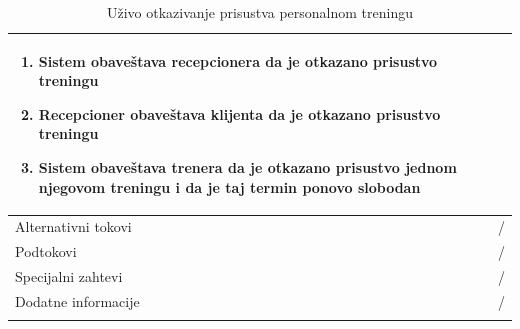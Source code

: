 \begin{longtable}{| p{} | p{} |}
\begin{enumerate}
    \item Sistem obaveštava recepcionera da je otkazano prisustvo treningu
    \item Recepcioner obaveštava klijenta da je otkazano prisustvo treningu
    \item Sistem obaveštava trenera da je otkazano prisustvo jednom njegovom treningu i da je taj termin ponovo slobodan
   \end{enumerate}\\
\hline
    Alternativni tokovi & /\\
\hline
    Podtokovi & /\\
\hline
    Specijalni zahtevi & /\\
\hline
    Dodatne informacije & /\\
\hline
\caption{Uživo otkazivanje prisustva personalnom treningu}
\end{longtable}


 